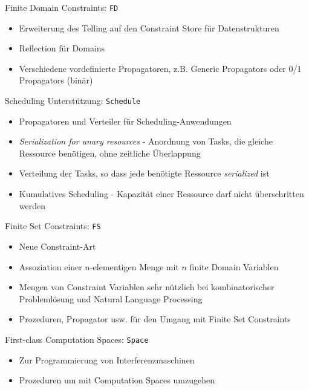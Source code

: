 \begin{frame}{Finite Domain Constraints: \texttt{FD} }
  \begin{itemize}
    \item Erweiterung des Telling auf den Constraint Store für
     Datenstrukturen
    \item Reflection für Domains
    \item Verschiedene vordefinierte Propagatoren, z.B. Generic Propagators
    oder 0/1 Propagators (binär) 
  \end{itemize}
\end{frame}

\begin{frame}{Scheduling Unterstützung: \texttt{Schedule}}
    \begin{itemize}
      \item Propagatoren und Verteiler für Scheduling-Anwendungen
      \item \textit{Serialization for unary resources} - Anordnung von Tasks, die
      gleiche Ressource benötigen, ohne zeitliche Überlappung
      \item Verteilung der Tasks, so dass jede benötigte Ressource \textit{serialized}
      ist
      \item Kumulatives Scheduling - Kapazität einer Ressource darf nicht
      überschritten werden
    \end{itemize} 
\end{frame}

\begin{frame}{Finite Set Constraints: \texttt{FS}}
  \begin{itemize}
    \item Neue Constraint-Art
    \item Assoziation einer $n$-elementigen Menge mit $n$ finite Domain
      Variablen
    \item Mengen von Constraint Variablen sehr nützlich bei kombinatorischer
      Problemlösung und Natural Language Processing
    \item Prozeduren, Propagator usw. für den Umgang mit Finite Set Constraints 
  \end{itemize}
\end{frame}

\begin{frame}{First-class Computation Spaces: \texttt{Space}}
  \begin{itemize}
    \item Zur Programmierung von Interferenzmaschinen 
    \item Prozeduren um mit Computation Spaces umzugehen
  \end{itemize} 
\end{frame}



